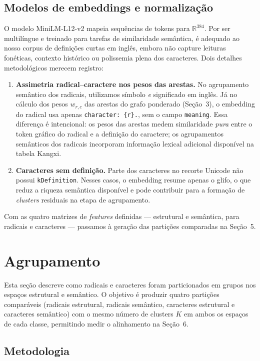 \documentclass[10pt, a4paper, titlepage]{extarticle}
\begin{document}
\subsection{Modelos de embeddings e normalização}
O modelo MiniLM-L12-v2 mapeia sequências de tokens para $\mathbb{R}^{384}$. Por ser multilíngue e treinado para tarefas de similaridade semântica, é adequado ao nosso corpus de definições curtas em inglês, embora não capture leituras fonéticas, contexto histórico ou polissemia plena dos caracteres.
Dois detalhes metodológicos merecem registro:
\begin{enumerate}
    \item \textbf{Assimetria radical--caractere nos pesos das arestas.} No agrupamento semântico dos radicais, utilizamos símbolo \emph{e} significado em inglês. Já no cálculo dos pesos $w_{r,c}$ das arestas do grafo ponderado (Seção~3), o embedding do radical usa apenas \texttt{character: \{r\}.}, sem o campo \texttt{meaning}. Essa diferença é intencional: os pesos das arestas medem similaridade \emph{pura} entre o token gráfico do radical e a definição do caractere; os agrupamentos semânticos dos radicais incorporam informação lexical adicional disponível na tabela Kangxi.
    \item \textbf{Caracteres sem definição.} Parte dos caracteres no recorte Unicode não possui \texttt{kDefinition}. Nesses casos, o embedding resume apenas o glifo, o que reduz a riqueza semântica disponível e pode contribuir para a formação de \emph{clusters} residuais na etapa de agrupamento.
\end{enumerate}
Com as quatro matrizes de \emph{features} definidas --- estrutural e semântica, para radicais e caracteres --- passamos à geração das partições comparadas na Seção~5.

\section{Agrupamento}
Esta seção descreve como radicais e caracteres foram particionados em grupos nos espaços estrutural e semântico. O objetivo é produzir quatro partições comparáveis (radicais estrutural, radicais semântico, caracteres estrutural e caracteres semântico) com o mesmo número de clusters $K$ em ambos os espaços de cada classe, permitindo medir o alinhamento na Seção~6.

\subsection{Metodologia}
\end{document}
